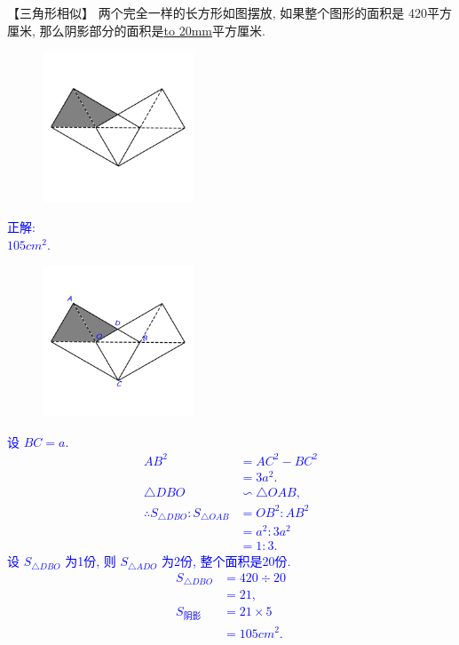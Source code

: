 \item {
    【三角形相似】
    两个完全一样的长方形如图摆放, 如果整个图形的面积是 420平方厘米, 那么阴影部分的面积是\underline{\hbox to 20mm{}}平方厘米.
    \begin{figure}[H]
        \centering
        \includegraphics[width=0.4\textwidth]{./pics/Chapter_2/5.png}
    \end{figure}
    \ifshowSolution 
        \fangsong{}\textcolor{blue}{
            正解: \\
            $105 {cm}^2$. 
            \begin{figure}[H]
                \centering
                \includegraphics[width=0.4\textwidth]{./pics/Chapter_2/seikai_5.png}
            \end{figure}
            设 $BC=a$. \\
            \begin{align*}
                {AB}^2 &= {AC}^2 - {BC}^2 \\
                       &= 3{a}^2. \\
                \triangle DBO &\backsim \triangle OAB,\\
                \therefore S_{\triangle DBO} : S_{\triangle OAB} &= {OB}^2 : {AB}^2 \\
                &= {a}^2 : 3{a}^2 \\
                &=  1:3.
            \end{align*}
            设 $S_{\triangle DBO}$ 为1份, 则 $S_{\triangle ADO}$ 为2份, 整个面积是20份.\\
            \begin{align*}
                S_{\triangle DBO} &= 420\div 20 \\
                       &= 21, \\
                S_{阴影} &= 21\times 5 \\
                &= 105 {cm}^2.
            \end{align*}
        }
    \else
        \vspace{1cm}
    \fi
}

